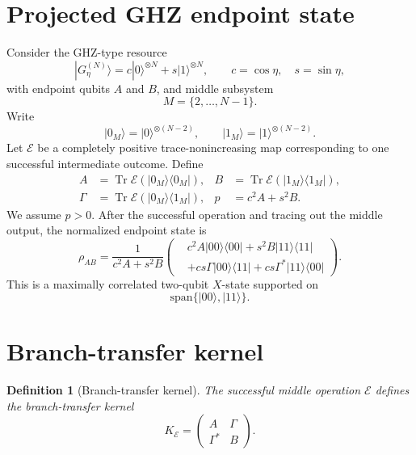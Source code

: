 \documentclass[reprint,aps,pra,superscriptaddress,nofootinbib,longbibliography]{revtex4-2}
\newtheorem{definition}[theorem]{Definition}
\newcommand{\ket}[1]{|#1\rangle}
\newcommand{\bra}[1]{\langle #1|}
\newcommand{\Tr}{\operatorname{Tr}}
\newcommand{\Kbr}{K_{\mathcal E}}
\begin{document}
\section{Projected GHZ endpoint state}

Consider the GHZ-type resource
\begin{equation}
\ket{G^{(N)}_\eta}
=
c\ket{0}^{\otimes N}+s\ket{1}^{\otimes N},
\qquad
c=\cos\eta,
\quad
s=\sin\eta,
\label{eq:ghz-resource}
\end{equation}
with endpoint qubits \(A\) and \(B\), and middle subsystem
\begin{equation}
M=\{2,\ldots,N-1\}.
\end{equation}
Write
\begin{equation}
\ket{0_M}=\ket{0}^{\otimes(N-2)},
\qquad
\ket{1_M}=\ket{1}^{\otimes(N-2)}.
\end{equation}
Let \(\mathcal E\) be a completely positive trace-nonincreasing map corresponding to one successful intermediate outcome.  Define
\begin{align}
A&=\Tr\mathcal E(\ket{0_M}\bra{0_M}),
&
B&=\Tr\mathcal E(\ket{1_M}\bra{1_M}),\nonumber\\
\Gamma&=\Tr\mathcal E(\ket{0_M}\bra{1_M}),
&
p&=c^2A+s^2B.
\label{eq:ABGammaP}
\end{align}
We assume \(p>0\).  After the successful operation and tracing out the middle output, the normalized endpoint state is
\begin{equation}
\rho_{AB}
=
\frac{1}{c^2A+s^2B}
\left(
\begin{aligned}
&c^2A\ket{00}\bra{00}
+s^2B\ket{11}\bra{11}\\
&+cs\Gamma\ket{00}\bra{11}
+cs\Gamma^*\ket{11}\bra{00}
\end{aligned}
\right).
\label{eq:endpoint-state}
\end{equation}
This is a maximally correlated two-qubit \(X\)-state supported on
\begin{equation}
\mathrm{span}\{\ket{00},\ket{11}\}.
\end{equation}

\section{Branch-transfer kernel}

\begin{definition}[Branch-transfer kernel]
The successful middle operation \(\mathcal E\) defines the branch-transfer kernel
\begin{equation}
\Kbr=
\begin{pmatrix}
A&\Gamma\\
\Gamma^*&B
\end{pmatrix}.
\label{eq:branch-kernel}
\end{equation}
\end{definition}
\end{document}
